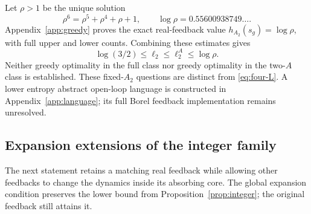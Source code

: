 \documentclass[11pt,reqno]{amsart}
\numberwithin{equation}{section}
\theoremstyle{definition}
\begin{document}
Let $\rho>1$ be the unique solution
\begin{equation}\label{eq:rho}
 \rho^6=\rho^5+\rho^4+\rho+1,
 \qquad\log\rho=0.55600938749\ldots.
\end{equation}
Appendix~\ref{app:greedy} proves the exact real-feedback value
$h_{A_2}(s_g)=\log\rho$, with full upper and lower counts.
Combining these estimates gives
\begin{equation}\label{eq:four-even}
 \log(3/2)\le\ell_2\le\ell_2^A\le\log\rho.
\end{equation}
Neither greedy optimality in the full class nor greedy optimality
in the two-$A$ class is established. These fixed-$A_2$ questions
are distinct from \eqref{eq:four-L}. A lower entropy abstract
open-loop language is constructed in Appendix~\ref{app:language};
its full Borel feedback implementation remains unresolved.


\subsection{Expansion extensions of the integer family}\label{sec:extensions}
The next statement retains a matching real feedback while allowing other
feedbacks to change the dynamics inside its absorbing core. The global
expansion condition preserves the lower bound from
Proposition~\ref{prop:integer}; the original feedback still attains it.
\end{document}
